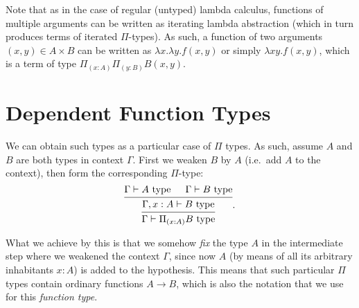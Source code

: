 Note that as in the case of regular (untyped) lambda calculus, functions of
multiple arguments can be written as iterating lambda abstraction
(which in turn produces terms of iterated $ \Pi $-types). As such,
a function of two arguments $ (x, y) \in A \times B $ can be written as
$ \lambda x . \lambda y . f(x, y) $ or simply $ \lambda xy.f(x,y) $,
which is a term of type $ \Pi_{(x : A)} \Pi_{(y : B)} B(x, y) $.

\section{Dependent Function Types}

We can obtain such types as a particular case of $ \Pi $ types.
As such, assume $ A $ and $ B $ are both types in context $ \Gamma $.
First we weaken $ B $ by $ A $ (i.e.\ add $ A $ to the context), then
form the corresponding $ \Pi $-type:
\[
  \begin{prooftree}
    \hypo{\Gamma \vdash A \text{ type}}
    \hypo{\Gamma \vdash B \text{ type}}
    \infer2{\Gamma, x : A \vdash B \text{ type}}
    \infer1{\Gamma \vdash \Pi_{(x : A)} B \text{ type}}
  \end{prooftree}.
\]

What we achieve by this is that we somehow \emph{fix} the type $ A $
in the intermediate step where we weakened the context $ \Gamma $,
since now $ A $ (by means of all its arbitrary inhabitants $ x : A $)
is added to the hypothesis. This means that such particular $ \Pi $
types contain ordinary functions $ A \to B $, which is also the
notation that we use for this \emph{function type}.

